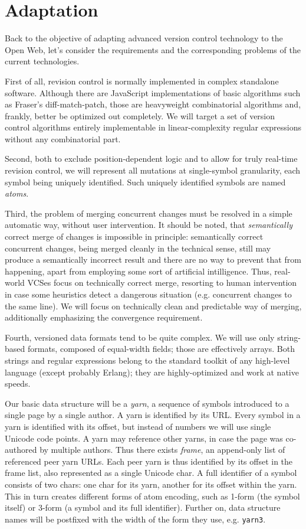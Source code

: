 \documentclass{acm_proc_article-sp}
\begin{document}
\section {Adaptation}   \label{sec:textile}

Back to the objective of adapting advanced version
control technology to the Open Web, let's consider the
requirements and the corresponding problems of the
current technologies.

First of all, revision control is normally implemented
in complex standalone software. Although there are JavaScript
implementations of basic algorithms such as Fraser's
diff-match-patch, those are heavyweight combinatorial
algorithms and, frankly, better be optimized out
completely. We will target a set of version control
algorithms entirely implementable in 
linear-complexity regular
expressions without any combinatorial part.

Second, both to exclude position-dependent logic and
to allow for truly real-time revision control, we will
represent all mutations at single-symbol granularity,
each symbol being uniquely identified. Such uniquely
identified symbols are named \emph{atoms}.

Third, the problem of merging concurrent changes must
be resolved in a simple automatic way, without user
intervention. It should be noted, that
\emph{semantically} correct merge of changes is impossible
in principle: semantically correct concurrent
changes, being merged cleanly in
the technical sense, still may produce a semantically
incorrect result and there are no way to prevent that
from happening,
apart from employing some sort of artificial
intilligence. Thus, real-world VCSes focus on technically
correct merge, resorting to human intervention in case
some heuristics detect a dangerous situation (e.g.
concurrent changes to the same line).
We will focus on technically clean and predictable way
of merging, additionally emphasizing the convergence
requirement.

Fourth, versioned data formats tend to be quite
complex. We will use only string-based formats,
composed of equal-width fields; those are effectively arrays.
Both strings and regular expressions belong to the standard
toolkit of any high-level language (except probably
Erlang); they are highly-optimized and work at native
speeds.

Our basic data structure will be a \emph{yarn}, a sequence of
symbols introduced to a single page by a single author.
A yarn is identified by its URL.
Every symbol in a yarn is identified with its offset,
but instead of numbers we will use single Unicode code points.
A yarn may reference other yarns, in case the page was
co-authored by multiple authors.
Thus there exists \emph{frame}, an append-only list
of referenced peer yarn URLs. Each peer yarn is thus
identified by its offset in the frame list, also represented as
a single Unicode char. A full identifier of a symbol
consists of two chars: one char for its yarn, another
for its offset within the yarn. This in turn creates
different forms of atom encoding, such as 1-form
(the symbol itself) or 3-form (a symbol and its full
identifier).
Further on, data structure names will be postfixed
with the width of the form they use, e.g. {\tt yarn3}.
\end{document}
